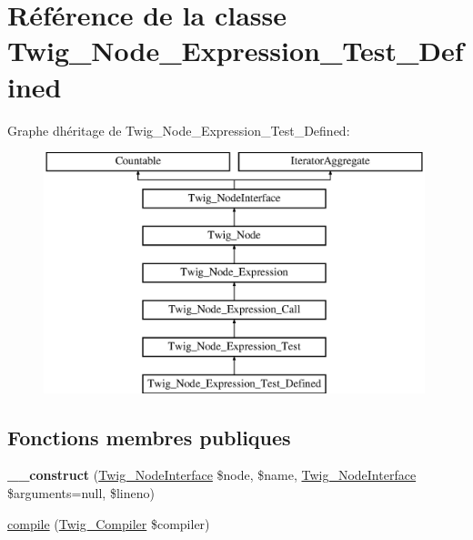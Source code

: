 \hypertarget{class_twig___node___expression___test___defined}{}\section{Référence de la classe Twig\+\_\+\+Node\+\_\+\+Expression\+\_\+\+Test\+\_\+\+Defined}
\label{class_twig___node___expression___test___defined}
Graphe d\textquotesingle{}héritage de Twig\+\_\+\+Node\+\_\+\+Expression\+\_\+\+Test\+\_\+\+Defined\+:\begin{figure}[H]
\begin{center}
\leavevmode
\includegraphics[height=7.000000cm]{class_twig___node___expression___test___defined}
\end{center}
\end{figure}
\subsection*{Fonctions membres publiques}
\begin{DoxyCompactItemize}
\item 
{\bfseries \+\_\+\+\_\+construct} (\hyperlink{interface_twig___node_interface}{Twig\+\_\+\+Node\+Interface} \$node, \$name, \hyperlink{interface_twig___node_interface}{Twig\+\_\+\+Node\+Interface} \$arguments=null, \$lineno)\hypertarget{class_twig___node___expression___test___defined_a341762e0b4ca6e93e6bfd4cc2f7a0b0b}{}\label{class_twig___node___expression___test___defined_a341762e0b4ca6e93e6bfd4cc2f7a0b0b}

\item 
\hyperlink{class_twig___node___expression___test___defined_a4e0faa87c3fae583620b84d3607085da}{compile} (\hyperlink{class_twig___compiler}{Twig\+\_\+\+Compiler} \$compiler)
\end{DoxyCompactItemize}
